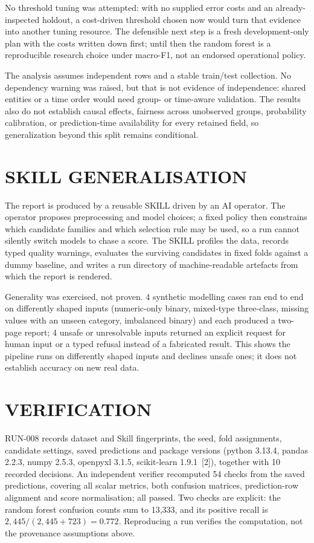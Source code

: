 \documentclass[10pt,a4paper,twocolumn]{article}
\begin{document}
No threshold tuning was attempted: with no supplied error costs and an
already-inspected holdout, a cost-driven threshold chosen now would turn that
evidence into another tuning resource. The defensible next step is a fresh
development-only plan with the costs written down first; until then the
random forest is a reproducible research choice under macro-F1, not an
endorsed operational policy.

The analysis assumes independent rows and a stable train/test collection. No
dependency warning was raised, but that is not evidence of independence:
shared entities or a time order would need group- or time-aware validation.
The results also do not establish causal effects, fairness across unobserved
groups, probability calibration, or prediction-time availability for every
retained field, so generalization beyond this split remains conditional.

\section*{SKILL GENERALISATION}
The report is produced by a reusable SKILL driven by an AI operator. The
operator proposes preprocessing and model choices; a fixed policy then
constrains which candidate families and which selection rule may be used, so a
run cannot silently switch models to chase a score. The SKILL profiles the
data, records typed quality warnings, evaluates the surviving candidates in
fixed folds against a dummy baseline, and writes a run directory of
machine-readable artefacts from which the report is rendered.

Generality was exercised, not proven. 4 synthetic modelling cases
ran end to end on differently shaped inputs (numeric-only binary, mixed-type
three-class, missing values with an unseen category, imbalanced binary) and each
produced a two-page report; 4 unsafe or unresolvable inputs
returned an explicit request for human input or a typed refusal instead of a
fabricated result. This shows the pipeline runs on differently shaped inputs and
declines unsafe ones; it does not establish accuracy on new real data.

\section*{VERIFICATION}
RUN-008 records dataset and Skill fingerprints, the seed, fold assignments,
candidate settings, saved predictions and package versions (python 3.13.4, pandas 2.2.3, numpy 2.5.3, openpyxl 3.1.5, scikit-learn 1.9.1~[2]), together
with 10 recorded decisions. An independent verifier recomputed
54 checks from the saved predictions, covering all scalar metrics, both
confusion matrices, prediction-row alignment and score normalisation; all
passed. Two checks are explicit: the random forest confusion counts sum
to 13,333, and its positive recall is
$2,445/(2,445+723)=0.772$. Reproducing a run
verifies the computation, not the provenance assumptions above.
\end{document}
